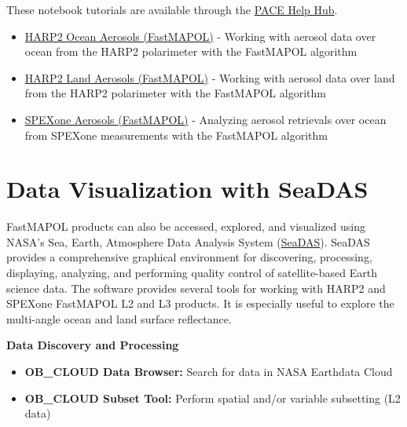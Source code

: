 \documentclass[
  11pt,
  letterpaper,
]{scrreprt}
\providecommand{\tightlist}{%
  \setlength{\itemsep}{0pt}\setlength{\parskip}{0pt}}
\begin{document}
These notebook tutorials are available through the
\href{https://nasa.github.io/oceandata-notebooks/sections/cloud-atmosphere.html}{PACE
Help Hub}.

\begin{itemize}
\tightlist
\item
  \href{https://nasa.github.io/oceandata-notebooks/notebooks/harp2/harp2_l2_fastmapol_aerosol_ocean_product.html}{HARP2
  Ocean Aerosols (FastMAPOL)} - Working with aerosol data over ocean
  from the HARP2 polarimeter with the FastMAPOL algorithm
\item
  \href{https://nasa.github.io/oceandata-notebooks/notebooks/harp2/harp2_l2_fastmapol_aerosol_land_product.html}{HARP2
  Land Aerosols (FastMAPOL)} - Working with aerosol data over land from
  the HARP2 polarimeter with the FastMAPOL algorithm
\item
  \href{https://nasa.github.io/oceandata-notebooks/notebooks/spexone/spexone_l2_fastmapol_aerosol_product.html}{SPEXone
  Aerosols (FastMAPOL)} - Analyzing aerosol retrievals over ocean from
  SPEXone measurements with the FastMAPOL algorithm
\end{itemize}


\chapter*{Data Visualization with
SeaDAS}\label{data-visualization-with-seadas}


FastMAPOL products can also be accessed, explored, and visualized using
NASA's Sea, Earth, Atmosphere Data Analysis System
(\href{https://www.earthdata.nasa.gov/data/tools/seadas}{SeaDAS}).
SeaDAS provides a comprehensive graphical environment for discovering,
processing, displaying, analyzing, and performing quality control of
satellite-based Earth science data. The software provides several tools
for working with HARP2 and SPEXone FastMAPOL L2 and L3 products. It is
especially useful to explore the multi-angle ocean and land surface
reflectance.

\textbf{Data Discovery and Processing}

\begin{itemize}
\tightlist
\item
  \textbf{OB\_CLOUD Data Browser:} Search for data in NASA Earthdata
  Cloud
\item
  \textbf{OB\_CLOUD Subset Tool:} Perform spatial and/or variable
  subsetting (L2 data)
\end{itemize}
\end{document}
